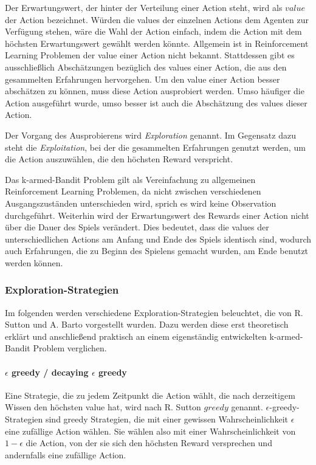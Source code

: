 \documentclass[11pt]{scrartcl}
\begin{document}
Der Erwartungswert, der hinter der Verteilung einer Action steht, wird als $value$ der Action
bezeichnet. Würden die values der einzelnen Actions dem Agenten zur Verfügung stehen, wäre die 
Wahl der Action einfach, indem die Action mit dem höchsten Erwartungswert gewählt werden 
könnte. Allgemein ist in Reinforcement Learning Problemen der value einer Action nicht bekannt.
Stattdessen gibt es ausschließlich Abschätzungen bezüglich des values einer Action, die aus den
gesammelten Erfahrungen hervorgehen. Um den value einer Action besser abschätzen zu können,
muss diese Action ausprobiert werden. Umso häufiger die Action ausgeführt wurde, umso besser
ist auch die Abschätzung des values dieser Action.

Der Vorgang des Ausprobierens wird \textit{Exploration} genannt. Im Gegensatz dazu steht die
\textit{Exploitation}, bei der die gesammelten Erfahrungen genutzt werden, um die Action
auszuwählen, die den höchsten Reward verspricht.

Das k-armed-Bandit Problem gilt als Vereinfachung zu allgemeinen Reinforcement Learning
Problemen, da nicht zwischen verschiedenen Ausgangszuständen unterschieden wird, sprich
es wird keine Observation durchgeführt. Weiterhin wird der Erwartungswert des
Rewards einer Action nicht über die Dauer des Spiels verändert. Dies bedeutet, dass die
values der unterschiedlichen Actions am Anfang und Ende des Spiels identisch sind, wodurch
auch Erfahrungen, die zu Beginn des Spielens gemacht wurden, am Ende benutzt werden
können.

\subsubsection{Exploration-Strategien}
Im folgenden werden verschiedene Exploration-Strategien beleuchtet, die von R. Sutton und
A. Barto \cite[~S.19]{SB1998} vorgestellt wurden. Dazu werden diese erst theoretisch
erklärt und anschließend praktisch an einem eigenständig entwickelten k-armed-Bandit
Problem verglichen.

\paragraph{$\epsilon$ greedy / decaying $\epsilon$ greedy}
Eine Strategie, die zu jedem Zeitpunkt die Action wählt, die nach derzeitigem Wissen den
höchsten value hat, wird nach R. Sutton \cite[~S.20]{SB1998} $greedy$ genannt.
$\epsilon$-greedy-Strategien sind greedy Strategien, die mit einer gewissen
Wahrscheinlichkeit $\epsilon$ eine zufällige Action wählen. Sie wählen also mit einer
Wahrscheinlichkeit von $1 - \epsilon$ die Action, von der sie sich den höchsten Reward
versprechen und andernfalls eine zufällige Action.
\end{document}
